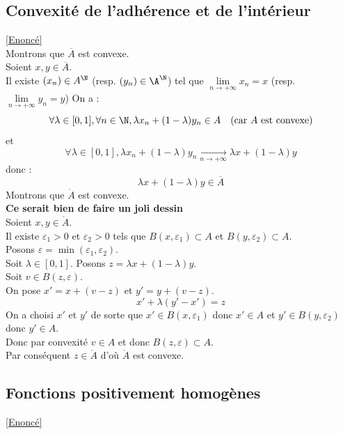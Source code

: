 \documentclass{book}
\begin{document}
	\subsection{Convexité de l'adhérence et de l'intérieur }
	\label{sec:convexite-de-ladherence-et-de-linterieur}
	\textcolor{blue}{\hyperref[Convexité de l'adhérence et de l'intérieur]{[Enoncé]}}\\
	Montrons que $\overline{A}$ est convexe.\\
	Soient $x,y\in \overline{A}$.\\
	Il existe $(x_n)\in A^\N$ (resp. $(y_n)\in\A^\N$) tel que $\lim\limits_{n\to +\infty}x_n=x$ (resp. $\lim\limits_{n\to +\infty}y_n=y$)
	On a : \[\forall \lambda \in[0,1], \forall n\in\N, \lambda x_n+(1-\lambda)y_n\in A \quad\text{(car $A$ est convexe)}\]
	et \[\forall \lambda\in[0,1], \lambda x_n+(1-\lambda)y_n\underset{n\to+\infty}{\to}\lambda x+(1-\lambda)y\]
	donc : \[\lambda x+(1-\lambda)y\in \overline{A}\]
	Montrons que $\ring A$ est convexe.\\
	\textbf{Ce serait bien de faire un joli dessin}\\
	Soient $x,y\in \ring{A}$.\\
	Il existe $\varepsilon_1>0$ et $\varepsilon_2>0$ tels que $B(x,\varepsilon_1)\subset A$ et $B(y,\varepsilon_2)\subset A$.\\
	Posons $\varepsilon=\min(\varepsilon_1,\varepsilon_2)$.\\
	Soit $\lambda\in[0,1]$. Posons $z=\lambda x +(1-\lambda)y$.\\
	Soit $v\in B(z,\varepsilon)$.\\
	On pose $x'= x+(v-z)$ et $y'=y+(v-z)$.\\
	\[x'+\lambda(y'-x')=z\]
	On a choisi $x'$ et $y'$ de sorte que $x'\in B(x,\varepsilon_1)$ donc $x'\in A$ et $y'\in B(y,\varepsilon_2)$ donc $y'\in A$.\\
	Donc par convexité $v\in A$ et donc $B(z,\varepsilon)\subset A$.\\
	Par conséquent $z\in \ring A$ d'où $\ring A$ est convexe.\\
	
	\subsection{Fonctions positivement homogènes}
	\label{sec:fonctions-positivement-homogenes}
	\textcolor{blue}{\hyperref[FOnctions positivement homogènes]{[Enoncé]}}\\
	
\end{document}

